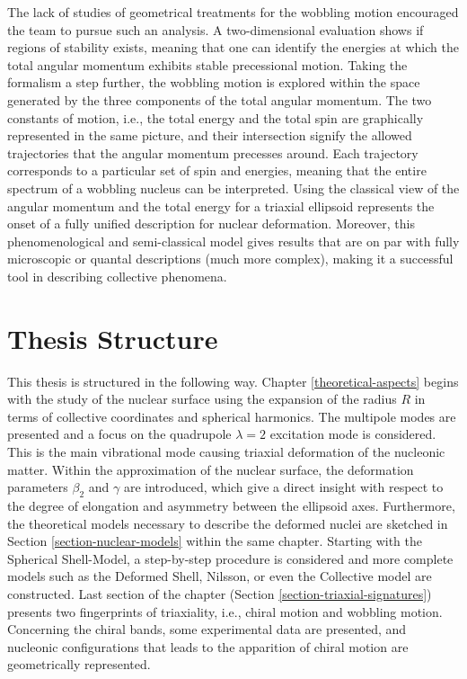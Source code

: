 The lack of studies of geometrical treatments for the wobbling motion encouraged the team to pursue such an analysis. A two-dimensional evaluation shows if regions of stability exists, meaning that one can identify the energies at which the total angular momentum exhibits stable precessional motion. Taking the formalism a step further, the wobbling motion is explored within the space generated by the three components of the total angular momentum. The two constants of motion, i.e., the total energy and the total spin are graphically represented in the same picture, and their intersection signify the allowed trajectories that the angular momentum precesses around. Each trajectory corresponds to a particular set of spin and energies, meaning that the entire spectrum of a wobbling nucleus can be interpreted. Using the classical view of the angular momentum and the total energy for a triaxial ellipsoid represents the onset of a fully unified description for nuclear deformation. Moreover, this phenomenological and semi-classical model gives results that are on par with fully microscopic or quantal descriptions (much more complex), making it a successful tool in describing collective phenomena.

\section*{Thesis Structure}

This thesis is structured in the following way. Chapter \ref{theoretical-aspects} begins with the study of the nuclear surface using the expansion of the radius $R$ in terms of collective coordinates and spherical harmonics. The multipole modes are presented and a focus on the quadrupole $\lambda=2$ excitation mode is considered. This is the main vibrational mode causing triaxial deformation of the nucleonic matter. Within the approximation of the nuclear surface, the deformation parameters $\beta_2$ and $\gamma$ are introduced, which give a direct insight with respect to the degree of elongation and asymmetry between the ellipsoid axes. Furthermore, the theoretical models necessary to describe the deformed nuclei are sketched in Section \ref{section-nuclear-models} within the same chapter. Starting with the Spherical Shell-Model, a step-by-step procedure is considered and more complete models such as the Deformed Shell, Nilsson, or even the Collective model are constructed. Last section of the chapter (Section \ref{section-triaxial-signatures}) presents two fingerprints of triaxiality, i.e., chiral motion and wobbling motion. Concerning the chiral bands, some experimental data are presented, and nucleonic configurations that leads to the apparition of chiral motion are geometrically represented. 

